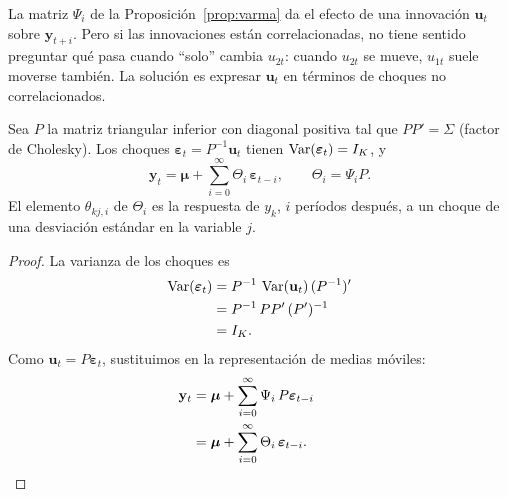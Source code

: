La matriz $\Psi_i$ de la Proposición~\ref{prop:varma} da el efecto de una innovación $\mathbf u_t$ sobre
$\mathbf y_{t+i}$. Pero si las innovaciones están correlacionadas, no tiene sentido preguntar qué pasa cuando
``solo'' cambia $u_{2t}$: cuando $u_{2t}$ se mueve, $u_{1t}$ suele moverse también. La solución es expresar
$\mathbf u_t$ en términos de choques no correlacionados.

\begin{proposicion}\label{prop:chol}
Sea $P$ la matriz triangular inferior con diagonal positiva tal que $PP'=\Sigma$ (factor de Cholesky). Los choques
$\boldsymbol\varepsilon_t=P^{-1}\mathbf u_t$ tienen $\operatorname{Var}(\boldsymbol\varepsilon_t)=I_K$, y
\[
  \mathbf y_t=\boldsymbol\mu+\sum_{i=0}^{\infty}\Theta_i\,\boldsymbol\varepsilon_{t-i},\qquad \Theta_i=\Psi_iP .
\]
El elemento $\theta_{kj,i}$ de $\Theta_i$ es la respuesta de $y_k$, $i$ períodos después, a un choque de una
desviación estándar en la variable $j$.
\end{proposicion}

\begin{proof}
La varianza de los choques es
\begin{align*}
  \operatorname{Var}(\boldsymbol\varepsilon_t) &= P^{-1}\,\operatorname{Var}(\mathbf u_t)\,(P^{-1})'\\
                                 &= P^{-1}\,PP'\,(P')^{-1}\\
                                 &= I_K .
\end{align*}
Como $\mathbf u_t=P\boldsymbol\varepsilon_t$, sustituimos en la representación de medias móviles:
\begin{align*}
  \mathbf y_t &= \boldsymbol\mu+\sum_{i=0}^{\infty}\Psi_i\,P\boldsymbol\varepsilon_{t-i}\\
              &= \boldsymbol\mu+\sum_{i=0}^{\infty}\Theta_i\,\boldsymbol\varepsilon_{t-i}. && \qedhere
\end{align*}
\end{proof}

